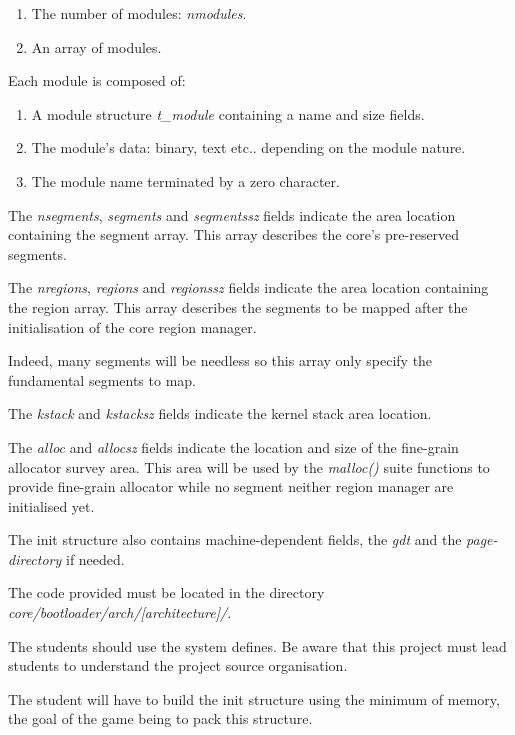 \begin{enumerate}
  \item
    The number of modules: \textit{nmodules}.
  \item
    An array of modules.
\end{enumerate}

Each module is composed of:

\begin{enumerate}
  \item
    A module structure \textit{t\_module} containing a name and size fields.
  \item
    The module's data: binary, text etc.. depending on the module nature.
  \item
    The module name terminated by a zero character.
\end{enumerate}

The \textit{nsegments}, \textit{segments} and \textit{segmentssz} fields
indicate the area location containing the segment array. This array
describes the core's pre-reserved segments.

The \textit{nregions}, \textit{regions} and \textit{regionssz} fields
indicate the area location containing the region array. This array
describes the segments to be mapped after the initialisation of the
core region manager.

Indeed, many segments will be needless so this array only specify the
fundamental segments to map.

The \textit{kstack} and \textit{kstacksz} fields indicate the kernel
stack area location.

The \textit{alloc} and \textit{allocsz} fields indicate the location
and size of the fine-grain allocator survey area. This area will be
used by the \textit{malloc()} suite functions to provide fine-grain
allocator while no segment neither region manager are initialised yet.

The  init  structure   also  contains  machine-dependent  fields,  the
\textit{gdt} and the \textit{page-directory} if needed.

The code provided must be located in the directory
\textit{core/bootloader/arch/[architecture]/}.

The students should use the system defines. Be aware that this project
must lead students to understand the project source organisation.

The student will have to build the init structure using the minimum
of memory, the goal of the game being to pack this structure.

